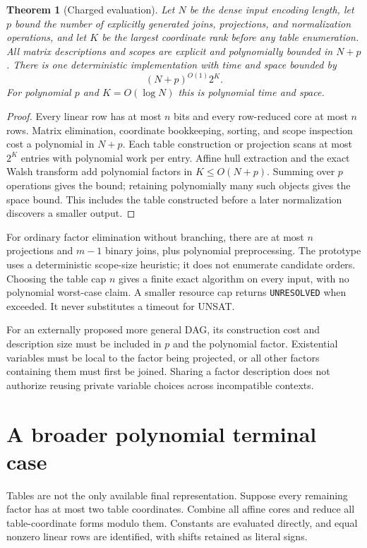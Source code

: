 \documentclass[11pt]{article}
\newtheorem{theorem}{Theorem}
\begin{document}
\begin{theorem}[Charged evaluation]\label{thm:cost}
Let $N$ be the dense input encoding length, let $p$ bound the number of explicitly
generated joins, projections, and normalization operations, and let $K$ be the
largest coordinate rank before any table enumeration. All matrix descriptions and
scopes are explicit and polynomially bounded in $N+p$. There is one deterministic
implementation with time and space bounded by
\[
 (N+p)^{O(1)}2^K.
\]
For polynomial $p$ and $K=O(\log N)$ this is polynomial time and space.
\end{theorem}
\begin{proof}
Every linear row has at most $n$ bits and every row-reduced core at most $n$ rows.
Matrix elimination, coordinate bookkeeping, sorting, and scope inspection cost a
polynomial in $N+p$. Each table construction or projection scans at most $2^K$
entries with polynomial work per entry. Affine hull extraction and the exact
Walsh transform add polynomial factors in $K\le O(N+p)$. Summing over $p$
operations gives the bound; retaining polynomially many such objects gives the
space bound. This includes the table constructed before a later normalization
discovers a smaller output.
\end{proof}

For ordinary factor elimination without branching, there are at most $n$
projections and $m-1$ binary joins, plus polynomial preprocessing. The prototype
uses a deterministic scope-size heuristic; it does not enumerate candidate orders.
Choosing the table cap $n$ gives a finite exact algorithm on every input, with no
polynomial worst-case claim. A smaller resource cap returns \texttt{UNRESOLVED}
when exceeded. It never substitutes a timeout for UNSAT.

For an externally proposed more general DAG, its construction cost and description
size must be included in $p$ and the polynomial factor. Existential variables must
be local to the factor being projected, or all other factors containing them must
first be joined. Sharing a factor description does not authorize reusing private
variable choices across incompatible contexts.

\section{A broader polynomial terminal case}
Tables are not the only available final representation. Suppose every remaining
factor has at most two table coordinates. Combine all affine cores and reduce all
table-coordinate forms modulo them. Constants are evaluated directly, and equal
nonzero linear rows are identified, with shifts retained as literal signs.
\end{document}
